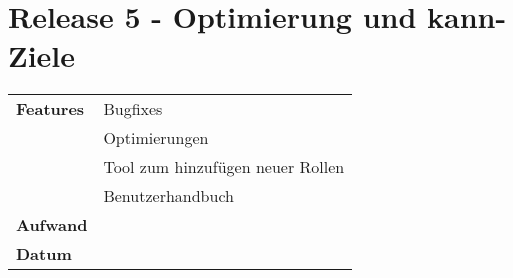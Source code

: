 \section*{Release 5 - Optimierung und kann-Ziele}
\label{sec:release_5}

\begin{tabular}{p{5cm} p{9cm}}
    \textbf{Features} &  Bugfixes \\
    & Optimierungen \\
    & Tool zum hinzufügen neuer Rollen \\
    & Benutzerhandbuch \\
    \hline
    \textbf{Aufwand} & \\
    \hline
    \textbf{Datum} & 
\end{tabular}